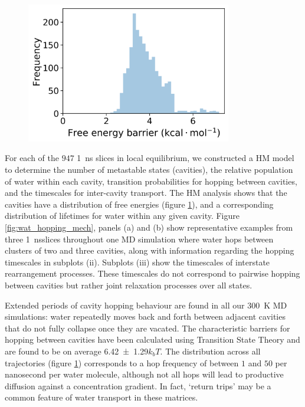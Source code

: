 \begin{figure}
    \centering
    \includegraphics[width=0.8\textwidth]{chapters/water_hopping/figures/Fig_S10.png}
    \label{fig:wat_free_energy_dist}
\end{figure}

For each of the $947$ \SI{1}{\nano\second} slices in local equilibrium, we constructed a HM model to determine the number of metastable states (cavities), the relative population of water within each cavity, transition probabilities for hopping between cavities, and the timescales for inter-cavity transport. The HM analysis shows that the cavities have a distribution of free energies (figure \ref{fig:wat_free_energy_dist}), and a corresponding distribution of lifetimes for water within any given cavity. Figure \ref{fig:wat_hopping_mech}, panels (a) and (b) show representative examples from three \SI{1}{\nano\second}slices throughout one MD simulation where water hops between clusters of two and three cavities, along with information regarding the hopping timescales in subplots (ii). Subplots (iii) show the timescales of interstate rearrangement processes. These timescales do not correspond to pairwise hopping between cavities but rather joint relaxation processes over all states.

Extended periods of cavity hopping behaviour are found in all our \SI{300}{\kelvin} MD simulations: water repeatedly moves back and forth between adjacent cavities that do not fully collapse once they are vacated. The characteristic barriers for hopping between cavities have been calculated using Transition State Theory and are found to be on average \num{6.42\pm1.29}$k_{b}T$. The distribution across all trajectories (figure \ref{fig:wat_free_energy_dist}) corresponds to a hop frequency of between $1$ and $50$ per nanosecond per water molecule, although not all hops will lead to productive diffusion against a concentration gradient. In fact, `return trips’ may be a common feature of water transport in these matrices.


